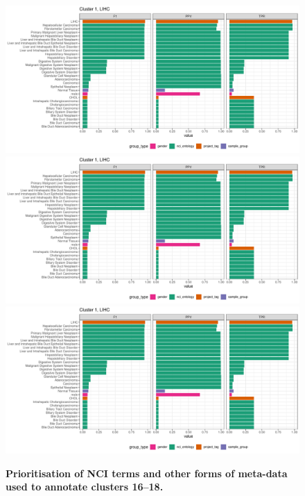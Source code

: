 \begin{figure}[H]
	\centering
	\includegraphics[width=.95\linewidth,page=16]{fig/tcga/cluster_labelling.pdf}
	\includegraphics[width=.95\linewidth,page=17]{fig/tcga/cluster_labelling.pdf}
	\includegraphics[width=.95\linewidth,page=18]{fig/tcga/cluster_labelling.pdf}
	\caption{
		\textbf{Prioritisation of NCI terms and other forms of meta-data used to annotate clusters 16--18.} 
	}
	\label{fig:cluslab6}
\end{figure}

